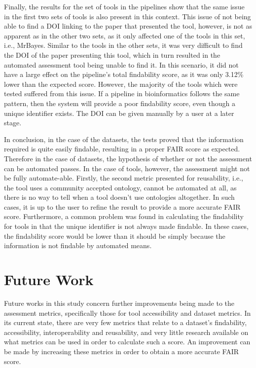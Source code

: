 \documentclass{cisfyp}
\begin{document}
Finally, the results for the set of tools in the pipelines show that the same issue in the first two sets of tools is also present in this context. This issue of not being able to find a DOI linking to the paper that presented the tool, however, is not as apparent as in the other two sets, as it only affected one of the tools in this set, i.e., MrBayes. Similar to the tools in the other sets, it was very difficult to find the DOI of the paper presenting this tool, which in turn resulted in the automated assessment tool being unable to find it. In this scenario, it did not have a large effect on the pipeline's total findability score, as it was only 3.12\% lower than the expected score. However, the majority of the tools which were tested suffered from this issue. If a pipeline in bioinformatics follows the same pattern, then the system will provide a poor findability score, even though a unique identifier exists. The DOI can be given manually by a user at a later stage.

In conclusion, in the case of the datasets, the tests proved that the information required is quite easily findable, resulting in a proper FAIR score as expected. Therefore in the case of datasets, the hypothesis of whether or not the assessment can be automated passes. In the case of tools, however, the assessment might not be fully automate-able. Firstly, the second metric presented for reusability, i.e., the tool uses a community accepted ontology, cannot be automated at all, as there is no way to tell when a tool doesn't use ontologies altogether. In  such cases, it is up to the user to refine the result to provide a more accurate FAIR score. Furthermore, a common problem was found in calculating the findability for tools in that the unique identifier is not always made findable. In these cases, the findability score would be lower than it should be simply because the information is not findable by automated means.
\chapter{Future Work}
Future works in this study concern further improvements being made to the assessment metrics, specifically those for tool accessibility and dataset metrics. In its current state, there are very few metrics that relate to a dataset's findability, accessibility, interoperability and reusability, and very little research available on what metrics can be used in order to calculate such a score. An improvement can be made by increasing these metrics in order to obtain a more accurate FAIR score.\newline
\end{document}
